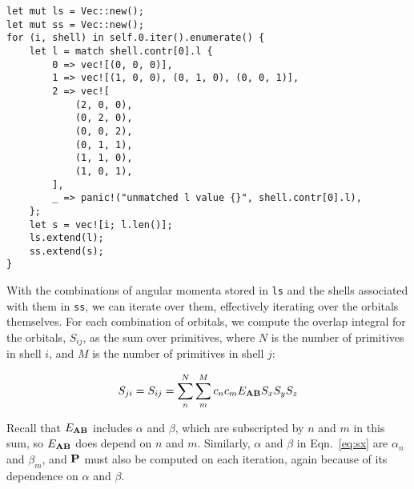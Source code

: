 \documentclass{achemso}
\newcommand\eab{E_{\vb A \vb B}}
\begin{document}
\begin{lstlisting}[caption={Collecting $l$ values for shells}, label={lst:ls}]
let mut ls = Vec::new();
let mut ss = Vec::new();
for (i, shell) in self.0.iter().enumerate() {
    let l = match shell.contr[0].l {
        0 => vec![(0, 0, 0)],
        1 => vec![(1, 0, 0), (0, 1, 0), (0, 0, 1)],
        2 => vec![
            (2, 0, 0),
            (0, 2, 0),
            (0, 0, 2),
            (0, 1, 1),
            (1, 1, 0),
            (1, 0, 1),
        ],
        _ => panic!("unmatched l value {}", shell.contr[0].l),
    };
    let s = vec![i; l.len()];
    ls.extend(l);
    ss.extend(s);
}
\end{lstlisting}

With the combinations of angular momenta stored in \verb|ls| and the shells
associated with them in \verb|ss|, we can iterate over them, effectively
iterating over the orbitals themselves. For each combination of orbitals, we
compute the overlap integral for the orbitals, $S_{ij}$, as the sum over
primitives, where $N$ is the number of primitives in shell $i$, and $M$ is the
number of primitives in shell $j$:

\begin{equation}
  \label{eq:sij}
  S_{ji} = S_{ij} = \sum_n^N\sum_m^M c_n c_m E_{\vb A \vb B} S_x S_y S_z
\end{equation}

Recall that $\eab$ includes $\alpha$ and $\beta$, which are subscripted by $n$
and $m$ in this sum, so $\eab$ does depend on $n$ and $m$. Similarly, $\alpha$
and $\beta$ in Eqn.~\ref{eq:sx} are $\alpha_n$ and $\beta_m$, and $\vb P$ must
also be computed on each iteration, again because of its dependence on $\alpha$
and $\beta$.


\end{document}
